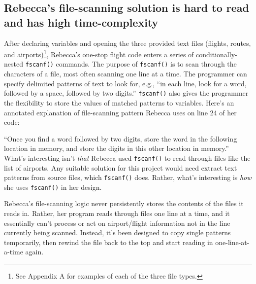 \subsection{Rebecca's file-scanning solution is hard to read and has high time-complexity}\label{rebeccas-file-scanning-solution-is-hard-to-read-and-has-high-time-complexity}

After declaring variables and opening the three provided text files (flights, routes, and airports)\footnote{See Appendix A for examples of each of the three file types.}, Rebecca's one-stop flight code enters a series of conditionally-nested \texttt{fscanf()} commands. The purpose of \texttt{fscanf()} is to scan through the characters of a file, most often scanning one line at a time. The programmer can specify delimited patterns of text to look for, e.g., ``in each line, look for a word, followed by a space, followed by two digits.'' \texttt{fscanf()} also gives the programmer the flexibility to store the values of matched patterns to variables. Here's an annotated explanation of file-scanning pattern Rebecca uses on line 24 of her code:

\begin{Shaded}
\end{Shaded}

``Once you find a word followed by two digits, store the word in the following location in memory, and store the digits in this other location in memory.'' What's interesting isn't \emph{that} Rebecca used \texttt{fscanf()} to read through files like the list of airports. Any suitable solution for this project would need extract text patterns from source files, which \texttt{fscanf()} does. Rather, what's interesting is \emph{how} she uses \texttt{fscanf()} in her design.

Rebecca's file-scanning logic never persistently stores the contents of the files it reads in. Rather, her program reads through files one line at a time, and it essentially can't process or act on airport/flight information not in the line currently being scanned. Instead, it's been designed to copy single patterns temporarily, then rewind the file back to the top and start reading in one-line-at-a-time again.

